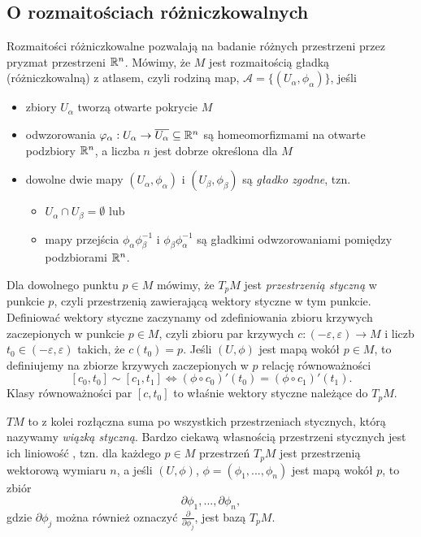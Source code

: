 \subsection{O rozmaitościach różniczkowalnych}\label{dodatek rozmaitosci}

Rozmaitości różniczkowalne pozwalają na badanie różnych przestrzeni przez pryzmat przestrzeni $\mathbb{R}^n$. Mówimy, że $M$ jest rozmaitością gładką (różniczkowalną) z atlasem, czyli rodziną map, $\mathcal{A}=\{ (U_\alpha, \phi_\alpha) \}$, jeśli
\begin{itemize}
  \item zbiory $U_\alpha$ tworzą otwarte pokrycie $M$
  \item odwzorowania $\varphi_\alpha:U_\alpha \to \overline{U_\alpha} \subseteq \mathbb{R}^n$ są homeomorfizmami na otwarte podzbiory $\mathbb{R}^n$, a liczba $n$ jest dobrze określona dla $M$
  \item dowolne dwie mapy $(U_\alpha, \phi_\alpha)$ i $(U_\beta, \phi_\beta)$ są \emph{gładko zgodne}, tzn.
    \begin{itemize}
      \item $U_\alpha \cap U_\beta=\emptyset$ lub
      \item mapy przejścia $\phi_\alpha \phi_\beta^{-1}$ i $\phi_\beta \phi_\alpha^{-1}$ są gładkimi odwzorowaniami pomiędzy podzbiorami $\mathbb{R}^n$.
    \end{itemize}
\end{itemize}

Dla dowolnego punktu $p \in M$ mówimy, że $T_p M$ jest \emph{przestrzenią styczną} w punkcie $p$, czyli przestrzenią zawierającą wektory styczne w tym punkcie. Definiować wektory styczne zaczynamy od zdefiniowania zbioru krzywych zaczepionych w punkcie $p \in M$, czyli zbioru par krzywych $c: (-\varepsilon, \varepsilon) \to M$ i liczb $t_0 \in (-\varepsilon, \varepsilon)$ takich, że $c(t_0)=p$. Jeśli $(U, \phi)$ jest mapą wokół $p \in M$, to definiujemy na zbiorze krzywych zaczepionych w $p$ relację równoważności 
$$ [c_0, t_0] \sim [c_1, t_1] \iff (\phi \circ  c_0)'(t_0)=(\phi \circ  c_1)'(t_1). $$
Klasy równoważności par $[c, t_0]$ to właśnie wektory styczne należące do $T_p M$.


$T M$ to z kolei rozłączna suma po wszystkich przestrzeniach stycznych, którą nazywamy \emph{wiązką styczną}. Bardzo ciekawą własnością przestrzeni stycznych jest ich liniowość \cite{leeSmoothManifolds}, tzn. dla każdego $p \in M$ przestrzeń $T_p M$ jest przestrzenią wektorową wymiaru $n$, a jeśli $(U, \phi)$, $\phi=(\phi_1,...,\phi_n)$ jest mapą wokół $p$, to zbiór
$$ { \partial \phi_1,..., \partial \phi_n }, $$
gdzie $\partial \phi_j$ można również oznaczyć $\frac{\partial}{\partial \phi_j}$, jest bazą $T_p M$.

